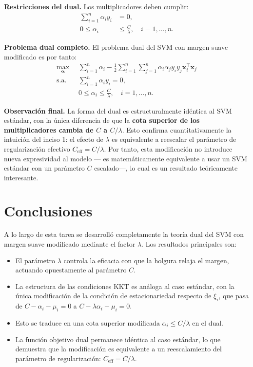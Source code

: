 \documentclass[spanish]{article}
\begin{document}
\textbf{Restricciones del dual.} Los multiplicadores deben cumplir:
\begin{align*}
\sum_{i=1}^{n}\alpha_i y_i &= 0, \\[2pt]
0 \leq \alpha_i &\leq \frac{C}{\lambda}, \quad i=1,\dots,n.
\end{align*}

\textbf{Problema dual completo.} El problema dual del SVM con margen suave modificado es por tanto:
\begin{equation}
\boxed{\;
\begin{aligned}
\max_{\boldsymbol{\alpha}}\;\; & \sum_{i=1}^{n}\alpha_i - \frac{1}{2}\sum_{i=1}^{n}\sum_{j=1}^{n}\alpha_i \alpha_j y_i y_j \mathbf{x}_i^\top \mathbf{x}_j \\
\text{s.a. }\;\; & \sum_{i=1}^{n}\alpha_i y_i = 0, \\
& 0 \leq \alpha_i \leq \frac{C}{\lambda}, \quad i=1,\dots,n.
\end{aligned}
\;}
\end{equation}

\textbf{Observación final.} La forma del dual es estructuralmente idéntica al SVM estándar, con la única diferencia de que la \textbf{cota superior de los multiplicadores cambia de $C$ a $C/\lambda$}. Esto confirma cuantitativamente la intuición del inciso 1: el efecto de $\lambda$ es equivalente a reescalar el parámetro de regularización efectivo $C_{\text{eff}} = C/\lambda$. Por tanto, esta modificación no introduce nueva expresividad al modelo --- es matemáticamente equivalente a usar un SVM estándar con un parámetro $C$ escalado---, lo cual es un resultado teóricamente interesante.

\section{Conclusiones}

A lo largo de esta tarea se desarrolló completamente la teoría dual del SVM con margen suave modificado mediante el factor $\lambda$. Los resultados principales son:

\begin{itemize}
    \item El parámetro $\lambda$ controla la eficacia con que la holgura relaja el margen, actuando opuestamente al parámetro $C$.
    \item La estructura de las condiciones KKT es análoga al caso estándar, con la única modificación de la condición de estacionariedad respecto de $\xi_i$, que pasa de $C - \alpha_i - \mu_i = 0$ a $C - \lambda\alpha_i - \mu_i = 0$.
    \item Esto se traduce en una cota superior modificada $\alpha_i \leq C/\lambda$ en el dual.
    \item La función objetivo dual permanece idéntica al caso estándar, lo que demuestra que la modificación es equivalente a un reescalamiento del parámetro de regularización: $C_{\text{eff}} = C/\lambda$.
\end{itemize}
\end{document}
